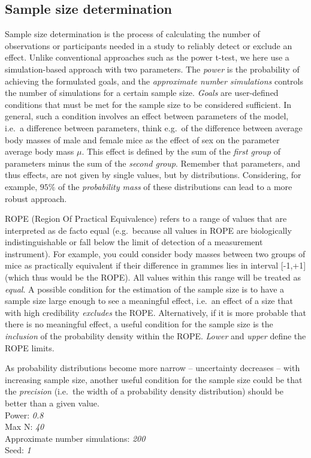 \documentclass[11pt]{scrartcl}\usepackage[]{graphicx}\usepackage[table]{xcolor}
\begin{document}
\subsection{Sample size determination} 
Sample size determination is the process of calculating the number of observations or participants needed in a study to reliably detect or exclude an effect. 
Unlike conventional approaches such as the power t-test, we here use a simulation-based approach with two parameters. 
The \textit{power} is the probability of achieving the formulated goals, and the \textit{approximate number simulations} controls the number of simulations for a certain sample size. 
\textit{Goals} are user-defined conditions that must be met for the sample size to be considered sufficient. 
In general, such a condition involves an effect between parameters of the model, i.e.\ a difference between parameters, think e.g.\ of the difference between average body masses of male and female mice as the effect of sex on the parameter average body mass $\mu$. This effect is defined by the sum of the \textit{first group} of parameters minus the sum of the \textit{second group}. Remember that parameters, and thus effects, are not given by single values, but by distributions. Considering, for example, $95\%$ of the \textit{probability mass} of these distributions can lead to a more robust approach. 

ROPE (Region Of Practical Equivalence) refers to a range of values that are interpreted as de facto equal (e.g.\ because all values in ROPE are biologically indistinguishable or fall below the limit of detection of a measurement instrument). For example, you could consider body masses between two groups of mice as practically equivalent if their difference in grammes lies in interval [-1,+1] (which thus would be the ROPE). All values within this range will be treated as \textit{equal}. A possible condition for the estimation of the sample size is to have a sample size large enough to see a meaningful effect, i.e.\ an effect of a size that with high credibility \textit{excludes} the ROPE. Alternatively, if it is more probable that there is no meaningful effect, a useful condition for the sample size is the \textit{inclusion} of the probability density within the ROPE. \textit{Lower} and \textit{upper} define the ROPE limits. 

As probability distributions become more narrow -- uncertainty decreases -- with increasing sample size, another useful condition for the sample size could be that the \textit{precision} (i.e.\ the width of a probability density distribution) should be better than a given value. \\Power: \textit{0.8}\\
Max N: \textit{40}\\
Approximate number simulations: \textit{200}\\
Seed: \textit{1}\\
\end{document}
